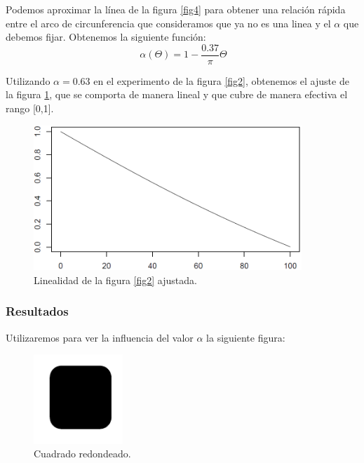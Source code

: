 Podemos aproximar la línea de la figura \ref{fig4} para obtener una relación rápida entre el arco de circunferencia que consideramos que ya no es una linea y el $\alpha$ que debemos fijar. Obtenemos la siguiente función:\\

\[
\ \alpha(\Theta) = 1- \frac{0.37}{\pi} \Theta
\]

Utilizando $\alpha = 0.63$ en el experimento de la figura \ref{fig2}, obtenemos el ajuste de la figura \ref{fig5}, que se comporta de manera lineal y que cubre de manera efectiva el rango [0,1].\\


\begin{figure}[H]
\begin{center}

\includegraphics[width=0.9\textwidth]{img/Ajuste-alfa.png}
\end{center}

\caption{Linealidad de la figura \ref{fig2} ajustada.}
\label{fig5}
\end{figure}

\subsubsection{Resultados}

Utilizaremos para ver la influencia del valor $\alpha$ la siguiente figura:\\

\begin{figure}[H]
\begin{center}

\includegraphics[width=0.3\textwidth]{img/device3-1.png}
\end{center}

\caption{Cuadrado redondeado.}
\label{cuadrado-red}
\end{figure}

